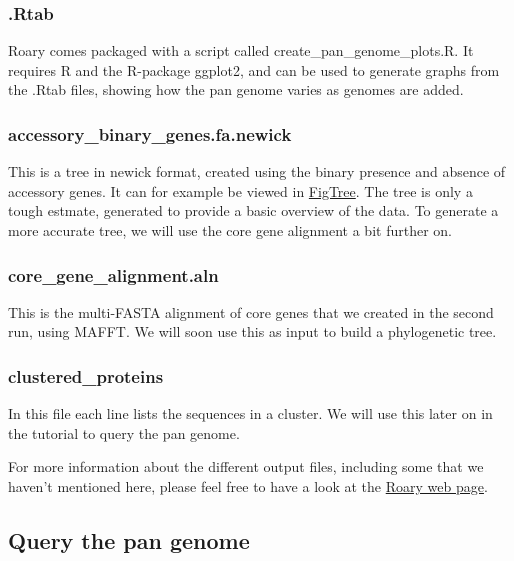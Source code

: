 \documentclass[11pt]{article}
\begin{document}
\hypertarget{rtab}{%
\subsubsection{.Rtab}\label{rtab}}

Roary comes packaged with a script called create\_pan\_genome\_plots.R.
It requires R and the R-package ggplot2, and can be used to generate
graphs from the .Rtab files, showing how the pan genome varies as
genomes are added.

\hypertarget{accessory_binary_genes.fa.newick}{%
\subsubsection{accessory\_binary\_genes.fa.newick}\label{accessory_binary_genes.fa.newick}}

This is a tree in newick format, created using the binary presence and
absence of accessory genes. It can for example be viewed in
\href{http://tree.bio.ed.ac.uk/software/figtree/}{FigTree}. The tree is
only a tough estmate, generated to provide a basic overview of the data.
To generate a more accurate tree, we will use the core gene alignment a
bit further on.

\hypertarget{core_gene_alignment.aln}{%
\subsubsection{core\_gene\_alignment.aln}\label{core_gene_alignment.aln}}

This is the multi-FASTA alignment of core genes that we created in the
second run, using MAFFT. We will soon use this as input to build a
phylogenetic tree.

\hypertarget{clustered_proteins}{%
\subsubsection{clustered\_proteins}\label{clustered_proteins}}

In this file each line lists the sequences in a cluster. We will use
this later on in the tutorial to query the pan genome.

    For more information about the different output files, including some
that we haven't mentioned here, please feel free to have a look at the
\href{https://sanger-pathogens.github.io/Roary/}{Roary web page}.

    \hypertarget{query-the-pan-genome}{%
\subsection{Query the pan genome}\label{query-the-pan-genome}}
\end{document}
